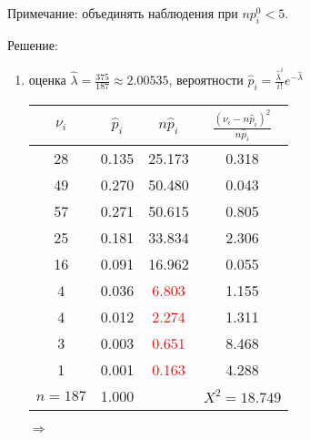 \documentclass[a4paper,12pt]{article}
\newif\ifsolutions
\begin{document}
Примечание: объединять наблюдения при $n p_i^0 < 5$.

\ifsolutions Решение: \par
    \begin{enumerate}
        \item оценка $\widehat{\lambda} = \frac{375}{187} \approx 2.00535$, вероятности $\widehat{p}_i = \frac{\widehat{\lambda}^i}{i!} e^{- \widehat{\lambda}}$

              \begin{tabular}{|c|c|c|c|}
                  \hline
                  $\nu_i$   & $\widehat{p}_i$ & $n \widehat{p}_i$      & $\frac{(\nu_i - n \widehat{p}_i)^2}{n \widehat{p}_i}$ \\
                  \hline
                  28        & 0.135           & 25.173                 & 0.318                                                 \\
                  49        & 0.270           & 50.480                 & 0.043                                                 \\
                  57        & 0.271           & 50.615                 & 0.805                                                 \\
                  25        & 0.181           & 33.834                 & 2.306                                                 \\
                  16        & 0.091           & 16.962                 & 0.055                                                 \\
                  4         & 0.036           & \textcolor{red}{6.803} & 1.155                                                 \\
                  4         & 0.012           & \textcolor{red}{2.274} & 1.311                                                 \\
                  3         & 0.003           & \textcolor{red}{0.651} & 8.468                                                 \\
                  1         & 0.001           & \textcolor{red}{0.163} & 4.288                                                 \\
                  \hline
                  $n = 187$ & 1.000           &                        & $X^2 = 18.749$                                        \\
                  \hline
              \end{tabular}
              $\Rightarrow$

\end{enumerate}
\end{document}
